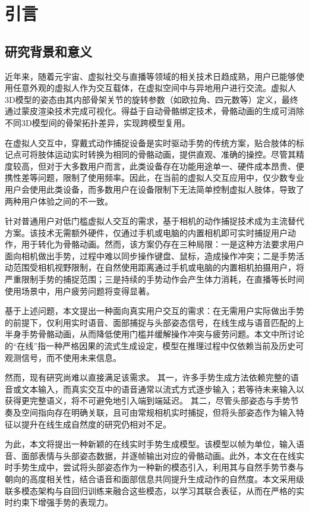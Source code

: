 
\chapter{引言}

\section{研究背景和意义}

近年来，随着元宇宙、虚拟社交与直播等领域的相关技术日趋成熟，用户已能够使用任意外观的虚拟人作为交互载体，在虚拟空间中与异地用户进行交流。虚拟人3D模型的姿态由其内部骨架关节的旋转参数（如欧拉角、四元数等）定义，最终通过蒙皮渲染技术完成可视化。得益于自动骨骼绑定技术，骨骼动画的生成可消除不同3D模型间的骨架拓扑差异，实现跨模型复用。

在虚拟人交互中，穿戴式动作捕捉设备是实时驱动手势的传统方案，贴合肢体的标记点可将肢体运动实时转换为相同的骨骼动画，提供直观、准确的操控。尽管其精度较高，但对于大多数用户而言，此类设备存在功能用途单一、硬件成本昂贵、便携性差等问题，限制了使用频率。因此，在当前的虚拟人交互应用中，仅少数专业用户会使用此类设备，而多数用户在设备限制下无法简单控制虚拟人肢体，导致了两种用户体验之间的不一致。

针对普通用户对低门槛虚拟人交互的需求，基于相机的动作捕捉技术\cite{mediapipefacemesh, AppleARKitTrackingGuide}成为主流替代方案。该技术无需额外硬件，仅通过手机或电脑的内置相机即可实时捕捉用户动作，用于转化为骨骼动画。然而，该方案仍存在三种局限：一是这种方法要求用户面向相机做出手势，过程中难以同步操作键盘、鼠标，造成操作冲突；二是手势活动范围受相机视野限制，在自然使用距离通过手机或电脑的内置相机拍摄用户，将严重限制手势的捕捉范围；三是持续的手势动作会产生体力消耗，在直播等长时间使用场景中，用户疲劳问题将变得显著。

基于上述问题，本文提出一种面向真实用户交互的需求：在无需用户实际做出手势的前提下，仅利用实时语音、面部捕捉与头部姿态信号，在线生成与语音匹配的上半身手势骨骼动画，从而降低使用门槛并缓解操作冲突与疲劳问题。本文中所讨论的“在线”指一种严格因果的流式生成设定，模型在推理过程中仅依赖当前及历史可观测信号，而不使用未来信息。

然而，现有研究尚难以直接满足该需求。
其一，许多手势生成方法依赖完整的语音或文本输入，而真实交互中的语音通常以流式方式逐步输入；若等待未来输入以获得更完整语义，将不可避免地引入端到端延迟。
其二，尽管头部姿态与手势节奏及空间指向存在明确关联，且可由常规相机实时捕捉，但将头部姿态作为输入特征以提升在线生成自然度的研究仍相对不足。

为此，本文将提出一种新颖的在线实时手势生成模型。该模型以帧为单位，输入语音、面部表情与头部姿态数据，并逐帧输出对应的骨骼动画。此外，本文在在线实时手势生成中，尝试将头部姿态作为一种新的模态引入，利用其与自然手势节奏与朝向的高度相关性，结合语音和面部信息共同提升生成动作的自然度。本文采用级联多模态架构与自回归训练来融合这些模态，以学习其联合表征，从而在严格的实时约束下增强手势的表现力。


